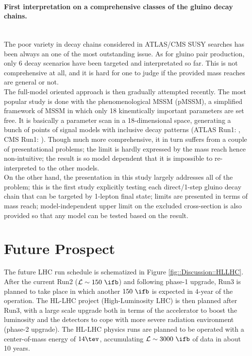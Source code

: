 \clearpage
\paragraph{First interpretation on a comprehensive classes of the gluino decay chains.} \mbox{} \\
The poor variety in decay chains considered in ATLAS/CMS SUSY searches has been always an one of the most outstanding issue.
As for gluino pair production, only 6 decay scenarios have been targeted and interpretated so far.
This is not comprehensive at all, and it is hard for one to judge if the provided mass reaches are general or not. \\

The full-model oriented approach is then gradually attempted recently.
The most popular study is done with the phenomenological MSSM (pMSSM), a simplified framework of MSSM in which only 18 kinemtically important parameters are set free.
It is basically a parameter scan in a 18-dimensional space, generating a bunch of points of signal models with inclusive decay patterns
(ATLAS Run1: \cite{ATLAS_Run1_pMSSM}\cite{ATLAS_Run1_DMpMSSM}, CMS Run1: \cite{CMS_MSSM_Run1}).
Though much more comprehensive, it in turn suffers from a couple of presentational problems; 
the limit is hardly expressed by the mass reach hence non-intuitive;
the result is so model dependent that it is impossible to re-interpreted to the other models. \\

On the other hand, the presentation in this study largely addresses all of the problem;
this is the first study explicitly testing each direct/1-step gluino decay chain that can be targeted by 1-lepton final state;
limits are presented in terms of mass reach;
model-independent upper limit on the excluded cross-section is also provided so that any model can be tested based on the result. \\


\section{Future Prospect}
The future LHC run schedule is schematized in Figure \ref{fig::Discussion::HLLHC}.
After the current Run2 ($\mathcal{L}\sim 150\,\,\ifb$) and following phase-1 upgrade, 
Run3 is planned to take place in which another $150\,\,\ifb$ is expected in 4-year of the operation. The HL-LHC project (High-Luminosity LHC) \cite{HLLHC} is then planned after Run3, 
with a large scale upgrade both in terms of the accelerator to boost the luminosity and the detectors to cope with more severe radiation environment (phase-2 upgrade). 
The HL-LHC physics runs are planned to be operated with a center-of-mass energy of $14\tev$, accumulating $\mathcal{L}\sim 3000\,\,\ifb$ of data in about 10 years. \\

